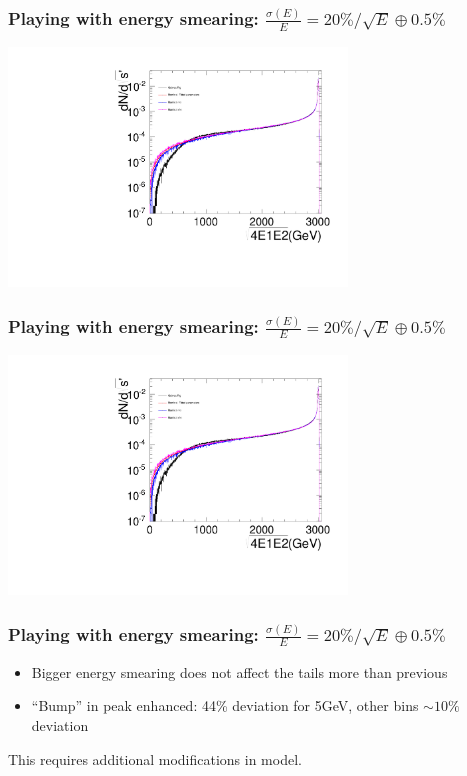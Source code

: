 \documentclass{beamer}
\begin{document}
\begin{frame}
\frametitle{Playing with energy smearing:
$\frac{\sigma(E)}{E}=20\%/\sqrt{E}\oplus0.5\%$}
\centering
\includegraphics[width=9cm,page=4]{Spectra_BHWide_Esmeared20005.pdf}
\end{frame}
\begin{frame}
\frametitle{Playing with energy smearing:
$\frac{\sigma(E)}{E}=20\%/\sqrt{E}\oplus0.5\%$}
\centering
\includegraphics[width=9cm,page=3]{Spectra_BHWide_Esmeared20005.pdf}
\end{frame}
\begin{frame}
\frametitle{Playing with energy smearing:
$\frac{\sigma(E)}{E}=20\%/\sqrt{E}\oplus0.5\%$}
\begin{itemize}
  \item Bigger energy smearing does not affect the tails more than previous
  \item ``Bump'' in peak enhanced: 44\% deviation for 5GeV, other bins 
  $\sim10\%$ deviation
\end{itemize}
This requires additional modifications in model.
\end{frame}
\end{document}
